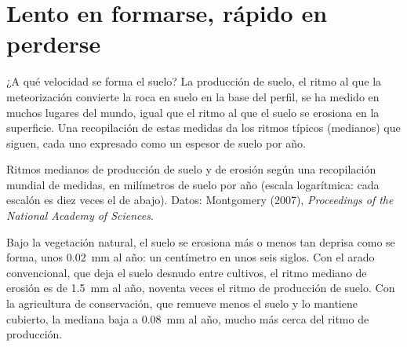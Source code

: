\section{Lento en formarse, rápido en perderse}

¿A qué velocidad se forma el suelo? La producción de suelo, el ritmo al que
la meteorización convierte la roca en suelo en la base del perfil, se ha
medido en muchos lugares del mundo, igual que el ritmo al que el suelo se
erosiona en la superficie. Una recopilación de estas medidas da los ritmos
típicos (medianos) que siguen, cada uno expresado como un espesor de suelo
por año.

\begin{omfigure}

{\small Ritmos medianos de producción de suelo y de erosión según una
recopilación mundial de medidas, en milímetros de suelo por año (escala
logarítmica: cada escalón es diez veces el de abajo). Datos: Montgomery
(2007), \emph{Proceedings of the National Academy of Sciences}.}
\end{omfigure}

Bajo la vegetación natural, el suelo se erosiona más o menos tan deprisa como
se forma, unos \qty{0.02}{mm} al año: un centímetro en unos seis siglos. Con
el arado convencional, que deja el suelo desnudo entre cultivos, el ritmo
mediano de erosión es de \qty{1.5}{mm} al año, noventa veces el ritmo de
producción de suelo. Con la agricultura de conservación, que remueve menos el
suelo y lo mantiene cubierto, la mediana baja a \qty{0.08}{mm} al año, mucho
más cerca del ritmo de producción.

